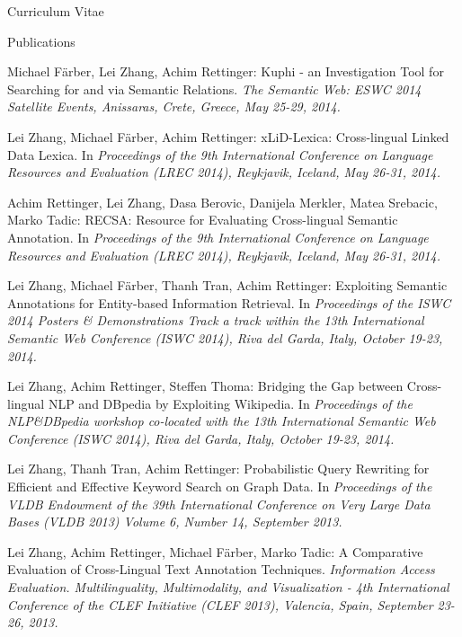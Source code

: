 \begin{cv}{\centerline{\LARGE Curriculum Vitae}}
\begin{cvlist}{Publications}
\begin{list}{}{\leftmargin=-1em}
    \item Michael Färber, Lei Zhang, Achim Rettinger: Kuphi - an Investigation Tool for Searching for and via Semantic Relations. \emph{The Semantic Web: ESWC 2014 Satellite Events, Anissaras, Crete, Greece, May 25-29, 2014.}
    
    \item Lei Zhang, Michael Färber, Achim Rettinger: xLiD-Lexica: Cross-lingual Linked Data Lexica. In \emph{Proceedings of the 9th International Conference on Language Resources and Evaluation (LREC 2014), Reykjavik, Iceland, May 26-31, 2014.}
    
    \item 	Achim Rettinger, Lei Zhang, Dasa Berovic, Danijela Merkler, Matea Srebacic, Marko Tadic: RECSA: Resource for Evaluating Cross-lingual Semantic Annotation. In \emph{Proceedings of the 9th International Conference on Language Resources and Evaluation (LREC 2014), Reykjavik, Iceland, May 26-31, 2014.}
    
    \item Lei Zhang, Michael Färber, Thanh Tran, Achim Rettinger: Exploiting Semantic Annotations for Entity-based Information Retrieval. In \emph{Proceedings of the ISWC 2014 Posters \& Demonstrations Track a track within the 13th International Semantic Web Conference (ISWC 2014), Riva del Garda, Italy, October 19-23, 2014.}
    
    \item Lei Zhang, Achim Rettinger, Steffen Thoma: Bridging the Gap between Cross-lingual NLP and DBpedia by Exploiting Wikipedia. In \emph{Proceedings of the NLP{\&}DBpedia workshop co-located with the 13th International Semantic Web Conference (ISWC 2014), Riva del Garda, Italy, October 19-23, 2014.}
    
    \item Lei Zhang, Thanh Tran, Achim Rettinger: Probabilistic Query Rewriting for Efficient and Effective Keyword Search on Graph Data. In \emph{Proceedings of the VLDB Endowment of the 39th International Conference on Very Large Data Bases (VLDB 2013) Volume 6, Number 14, September 2013.}
    
    \item Lei Zhang, Achim Rettinger, Michael Färber, Marko Tadic: A Comparative Evaluation of Cross-Lingual Text Annotation Techniques. \emph{Information Access Evaluation. Multilinguality, Multimodality, and Visualization - 4th International Conference of the CLEF Initiative (CLEF 2013), Valencia, Spain, September 23-26, 2013.}
    

\end{list}
\end{cvlist}
\end{cv}
